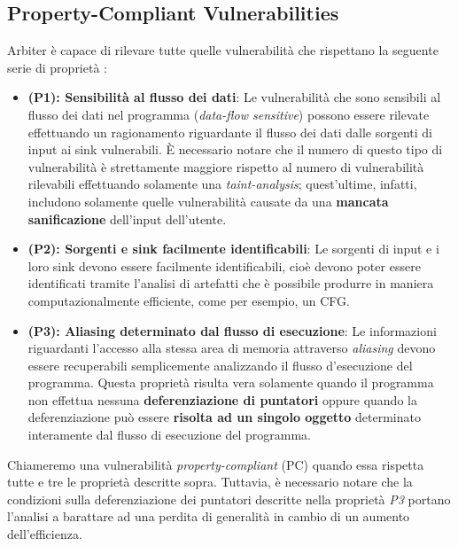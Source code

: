 \documentclass[../main.tex]{subfiles}
\begin{document}
\subsection{Property-Compliant Vulnerabilities}
Arbiter è capace di rilevare tutte quelle vulnerabilità che rispettano la seguente serie di proprietà \cite{Arbier}:
\begin{itemize}
    \item \textbf{(P1): Sensibilità al flusso dei dati}: Le vulnerabilità che sono sensibili al flusso dei dati nel programma (\textit{data-flow sensitive}) possono essere rilevate effettuando
    un ragionamento riguardante il flusso dei dati dalle sorgenti di input ai sink vulnerabili. È necessario notare che il numero di questo tipo di vulnerabilità è strettamente maggiore rispetto al numero di vulnerabilità
    rilevabili effettuando solamente una \textit{taint-analysis}; quest'ultime, infatti, includono solamente quelle vulnerabilità causate da una \textbf{mancata sanificazione} dell'input dell'utente.
    \item \textbf{(P2): Sorgenti e sink facilmente identificabili}: Le sorgenti di input e i loro sink devono essere facilmente identificabili, cioè devono poter essere identificati tramite l'analisi di artefatti che è possibile
    produrre in maniera computazionalmente efficiente, come per esempio, un CFG.
    \item \textbf{(P3): Aliasing determinato dal flusso di esecuzione}: Le informazioni riguardanti l'accesso alla stessa area di memoria attraverso \textit{aliasing} devono essere recuperabili semplicemente analizzando il flusso d'esecuzione del programma.
    Questa proprietà risulta vera solamente quando il programma non effettua nessuna \textbf{deferenziazione di puntatori} oppure quando la deferenziazione può essere \textbf{risolta ad un singolo oggetto} determinato interamente dal flusso di esecuzione del programma.
\end{itemize}
Chiameremo una vulnerabilità \textit{property-compliant} (PC) quando essa rispetta tutte e tre le proprietà descritte sopra. Tuttavia, è necessario notare che la condizioni sulla deferenziazione dei puntatori descritte nella proprietà \textit{P3} portano
l'analisi a barattare ad una perdita di generalità in cambio di un aumento dell'efficienza.
\end{document}
